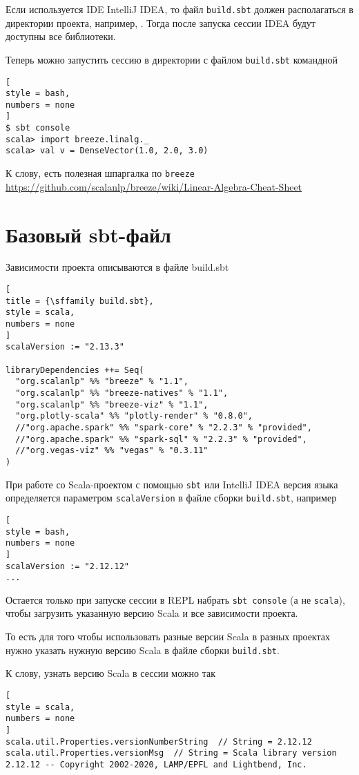 \documentclass[%
	11pt,
	a4paper,
	utf8,
		]{article}
\begin{document}
Если используется IDE IntelliJ IDEA, то файл \texttt{build.sbt} должен располагаться в директории проекта, например, . Тогда после запуска сессии IDEA будут доступны все библиотеки.

Теперь можно запустить сессию в директории с файлом \texttt{build.sbt} командной
\begin{lstlisting}[
style = bash,
numbers = none
]
$ sbt console
scala> import breeze.linalg._
scala> val v = DenseVector(1.0, 2.0, 3.0)
\end{lstlisting}

К слову, есть полезная шпаргалка по \texttt{breeze} \url{https://github.com/scalanlp/breeze/wiki/Linear-Algebra-Cheat-Sheet}

\section{Базовый sbt-файл}

Зависимости проекта описываются в файле \textsf{build.sbt}

\begin{lstlisting}[
title = {\sffamily build.sbt},
style = scala,
numbers = none	
]
scalaVersion := "2.13.3"

libraryDependencies ++= Seq(
  "org.scalanlp" %% "breeze" % "1.1",
  "org.scalanlp" %% "breeze-natives" % "1.1",
  "org.scalanlp" %% "breeze-viz" % "1.1",
  "org.plotly-scala" %% "plotly-render" % "0.8.0",
  //"org.apache.spark" %% "spark-core" % "2.2.3" % "provided",
  //"org.apache.spark" %% "spark-sql" % "2.2.3" % "provided",
  //"org.vegas-viz" %% "vegas" % "0.3.11"
)
\end{lstlisting}

При работе со Scala-проектом с помощью \texttt{sbt} или IntelliJ IDEA версия языка определяется параметром \texttt{scalaVersion} в файле сборки \texttt{build.sbt}, например
\begin{lstlisting}[
style = bash,
numbers = none	
]
scalaVersion := "2.12.12"
...
\end{lstlisting}

Остается только при запуске сессии в REPL набрать \texttt{sbt console} (а не \texttt{scala}), чтобы загрузить указанную версию Scala и все зависимости проекта.

То есть для того чтобы использовать разные версии Scala в разных проектах нужно указать нужную версию Scala в файле сборки \texttt{build.sbt}.

К слову, узнать версию Scala в сессии можно так
\begin{lstlisting}[
style = scala,
numbers = none	
]
scala.util.Properties.versionNumberString  // String = 2.12.12
scala.util.Properties.versionMsg  // String = Scala library version 2.12.12 -- Copyright 2002-2020, LAMP/EPFL and Lightbend, Inc.
\end{lstlisting}
\end{document}
